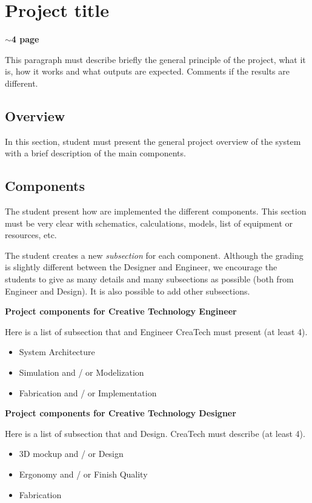 
\section*{Project title }
\textbf{$\sim$4 page}

This paragraph must describe briefly the general principle of the project, what it is, how it works and what outputs are expected. Comments if the results are different. 

\subsection*{Overview}
In this section, student must present the general project overview of the system with a brief description of the main components. 


\subsection*{Components}

The student present how are implemented the different components. This section must be very clear with schematics, calculations, models, list of equipment or resources, etc. 

The student creates a new \textit{subsection} for each component. Although the grading is slightly different between the Designer and Engineer, we encourage the students to give as many details and many subsections as possible (both from Engineer and Design). It is also possible to add other subsections. 

\textbf{Project components for Creative Technology Engineer}

Here is a list of subsection that and Engineer CreaTech must present (at least 4). 

\begin{itemize}
    \item System Architecture
    \item Simulation and / or Modelization
    \item Fabrication and / or Implementation
\end{itemize}


\textbf{Project components for Creative Technology Designer}

Here is a list of subsection that and Design. CreaTech must describe (at least 4). 


\begin{itemize}
    \item 3D mockup and / or Design 
    \item Ergonomy and / or Finish Quality
    \item Fabrication
\end{itemize}

